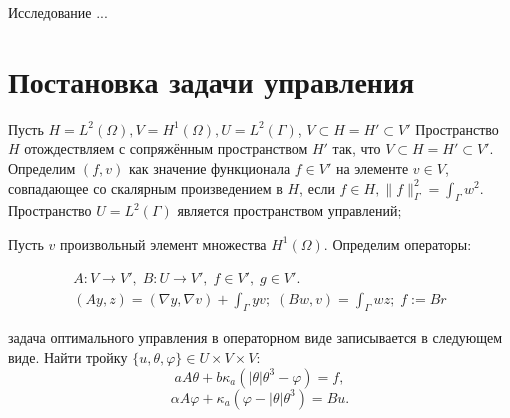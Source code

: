 \documentclass[10pt]{article}
\begin{document}
    Исследование ...

    \section{Постановка задачи управления}\label{sec:formalization}
    Пусть $H = L^2(\Omega), V = H^1(\Omega), U = L^2(\Gamma)$, $V \subset H = H' \subset V'$
    Пространство $H$ отождествляем с сопряжённым пространством $H'$ так,
    что $V \subset H = H' \subset V'$.
    Определим $(f,v)$ как значение функционала $f \in V'$ на элементе $v \in V$,
    совпадающее со скалярным произведением в $H$, если $f\in H, \|f\|_\Gamma^2 = \int_\Gamma w^2$.
    Пространство $U = L^2(\Gamma)$ является пространством управлений;


    Пусть $v$ произвольный элемент множества $H^1(\Omega)$.
    Определим операторы:

    \begin{gather*}
        A \colon V \to V', \; B \colon U \to V', \; f \in V', \; g \in V'.\\
        (A y,z) = (\nabla y, \nabla v) + \int_\Gamma y v; \;
        (B w, v) = \int_\Gamma w z; \; f := Br
    \end{gather*}

    задача оптимального управления в операторном виде записывается в следующем виде.
    Найти тройку $\{u, \theta, \varphi \} \in U \times V \times V$:
    \begin{equation}
        \label{weak-theta}
        a A \theta + b \kappa_a (| \theta | \theta^3 - \varphi ) = f,
    \end{equation}
    \begin{equation}
        \label{weak-phi}
        \alpha A \varphi + \kappa_a (\varphi - |\theta|\theta^3)  = Bu.
    \end{equation}
\end{document}
